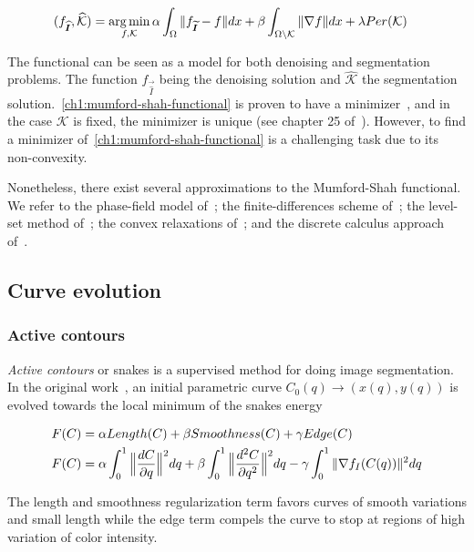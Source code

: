 \begin{align}
	(f_{\bm{\widehat{I}}},\mathcal{\widehat{K}}) &= \operatorname*{arg\,min}_{f,\mathcal{K}} \alpha \int_{\Omega}{ \lVert f_{\bm{\widetilde{I}}}-f\rVert dx} + \beta \int_{\Omega \setminus \mathcal{K}}{\lVert\nabla f\rVert dx} + \lambda Per(\mathcal{K})
	\label{ch1:mumford-shah-functional}
\end{align}

The functional can be seen as a model for both denoising and segmentation problems. The function $f_{\vec{\widehat{I}}}$ being the denoising solution and $\mathcal{\widehat{K}}$ the segmentation solution.~\cref{ch1:mumford-shah-functional} is proven to have a minimizer~\cite{degiorgi89}, and in the case $\mathcal{K}$ is fixed, the minimizer is unique (see chapter 25 of~\cite{bar11}). However, to find a minimizer of~\cref{ch1:mumford-shah-functional} is a challenging task due to its non-convexity.

Nonetheless, there exist several approximations to the Mumford-Shah functional. We refer to the phase-field model of~\cite{ambrosio90}; the finite-differences scheme of~\cite{chambolle99}; the level-set method of~\cite{vese02}; the convex relaxations of~\cite{pock09,strekalovskiy14}; and the discrete calculus approach of~\cite{foare17}.

\subsection{Curve evolution}

\subsubsection{Active contours}
\emph{Active contours} or snakes is a supervised method for doing image segmentation. In the original work~\cite{kass88}, an initial parametric curve $C_0(q) \rightarrow (x(q),y(q))$ is evolved towards the local minimum of the snakes energy

\begin{align}
	F(C) &= \alpha Length(C) + \beta Smoothness(C) + \gamma Edge(C) \nonumber \\
	F(C) &= \alpha \int_{0}^{1}{ \Big\lVert \frac{dC}{\partial q} \Big\rVert^2 dq } + \beta \int_{0}^{1}{ \Big\lVert \frac{d^2C}{\partial q^2} \Big\rVert^2dq} -\gamma \int_{0}^{1}{ \lVert \nabla f_I(C(q))\rVert^2 dq}
	\label{ch1:eq:snakes-energy}
\end{align}

The length and smoothness regularization term favors curves of smooth variations and  small length while the edge term compels the curve to stop at regions of high variation of color intensity. 

